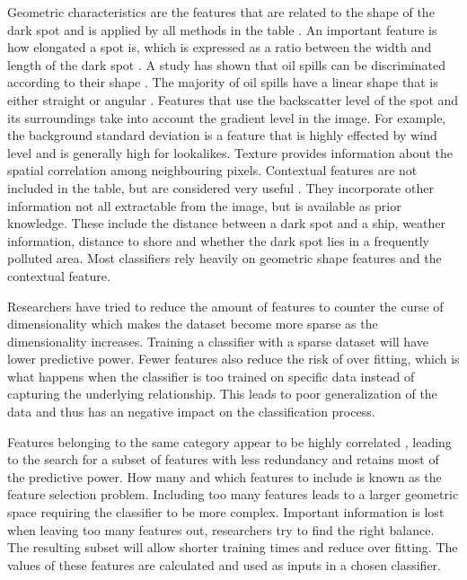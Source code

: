 Geometric characteristics are the features that are related to the shape of the dark spot and is applied by all methods in the table \cite{Topouzelis200930}. An important feature is how elongated a spot is, which is expressed as a ratio between the width and length of the dark spot \cite{Gasull20071}. A study has shown that oil spills can be discriminated according to their shape \cite{Guo2014146}. The majority of oil spills have a linear shape that is either straight or angular \cite{Pavlakis200156}. Features that use the backscatter level of the spot and its surroundings take into account the gradient level in the image. For example, the background standard deviation is a feature that is highly effected by wind level and is generally high for lookalikes. Texture provides information about the spatial correlation among neighbouring pixels. Contextual features are not included in the table, but are considered very useful \cite{Topouzelis200930}. They incorporate other information not all extractable from the image, but is available as prior knowledge. These include the distance between a dark spot and a ship, weather information, distance to shore and whether the dark spot lies in a frequently polluted area. Most classifiers rely heavily on geometric shape features and the contextual feature. \cite{Xu201414}

Researchers have tried to reduce the amount of features to counter the curse of dimensionality which makes the dataset become more sparse as the dimensionality increases. Training a classifier with a sparse dataset will have lower predictive power. Fewer features also reduce the risk of over fitting, which is what happens when the classifier is too trained on specific data instead of capturing the underlying relationship. This leads to poor generalization of the data and thus has an negative impact on the classification process.

Features belonging to the same category appear to be highly correlated \cite{Xu201414}, leading to the search for a subset of features with less redundancy and retains most of the predictive power. How many and which features to include is known as the feature selection problem. Including too many features leads to a larger geometric space requiring the classifier to be more complex. Important information is lost when leaving too many features out, researchers try to find the right balance. The resulting subset will allow shorter training times and reduce over fitting. The values of these features are calculated and used as inputs in a chosen classifier.
